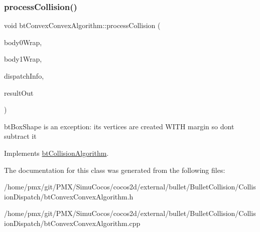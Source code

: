 \subsubsection{\texorpdfstring{process\+Collision()}{processCollision()}}
{\footnotesize\ttfamily void bt\+Convex\+Convex\+Algorithm\+::process\+Collision (\begin{DoxyParamCaption}\item[{const \hyperlink{structbtCollisionObjectWrapper}{bt\+Collision\+Object\+Wrapper} $\ast$}]{body0\+Wrap,  }\item[{const \hyperlink{structbtCollisionObjectWrapper}{bt\+Collision\+Object\+Wrapper} $\ast$}]{body1\+Wrap,  }\item[{const \hyperlink{structbtDispatcherInfo}{bt\+Dispatcher\+Info} \&}]{dispatch\+Info,  }\item[{\hyperlink{classbtManifoldResult}{bt\+Manifold\+Result} $\ast$}]{result\+Out }\end{DoxyParamCaption})\hspace{0.3cm}{\ttfamily [virtual]}}

bt\+Box\+Shape is an exception\+: its vertices are created W\+I\+TH margin so don\textquotesingle{}t subtract it 

Implements \hyperlink{classbtCollisionAlgorithm}{bt\+Collision\+Algorithm}.



The documentation for this class was generated from the following files\+:\begin{DoxyCompactItemize}
\item 
/home/pmx/git/\+P\+M\+X/\+Simu\+Cocos/cocos2d/external/bullet/\+Bullet\+Collision/\+Collision\+Dispatch/bt\+Convex\+Convex\+Algorithm.\+h\item 
/home/pmx/git/\+P\+M\+X/\+Simu\+Cocos/cocos2d/external/bullet/\+Bullet\+Collision/\+Collision\+Dispatch/bt\+Convex\+Convex\+Algorithm.\+cpp\end{DoxyCompactItemize}
